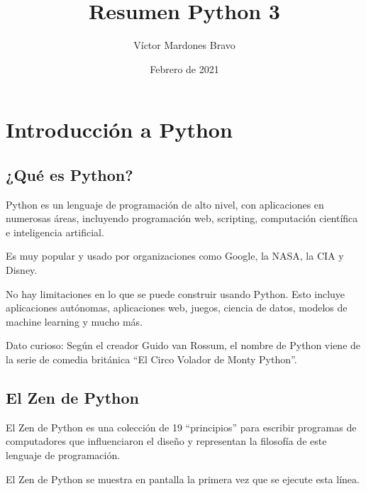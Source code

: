 \documentclass{article}
\title{Resumen Python 3}
\author{Víctor Mardones Bravo}
\date{Febrero de 2021}
\newcommand{\doble}[1]{``#1''}
\begin{document}

\null
\nointerlineskip
\vfill
\let\snewpage \newpage
\let\newpage \relax
  {\centering\def\svgwidth{\columnwidth}
  }
\maketitle
\let \newpage \snewpage
\vfill 
\break

\newpage


\section{Introducción a Python}

\subsection{¿Qué es Python?}

Python es un lenguaje de programación de alto nivel, con aplicaciones en numerosas áreas, incluyendo programación web, scripting, computación científica e inteligencia artificial.

Es muy popular y usado por organizaciones como Google, la NASA, la CIA y Disney.

No hay limitaciones en lo que se puede construir usando Python. Esto incluye aplicaciones autónomas, aplicaciones web, juegos, ciencia de datos, modelos de machine learning y mucho más.

Dato curioso: Según el creador Guido van Rossum, el nombre de Python viene de la serie de comedia británica \doble{El Circo Volador de Monty Python}.

\subsection{El Zen de Python}

El Zen de Python es una colección de 19 \doble{principios} para escribir programas de computadores que influenciaron el diseño y representan la filosofía de este lenguaje de programación.

\begin{listing*}[ht!]
  \caption{El Zen de Python se muestra en pantalla la primera vez que se ejecute esta línea.}
\end{listing*}
\end{document}
